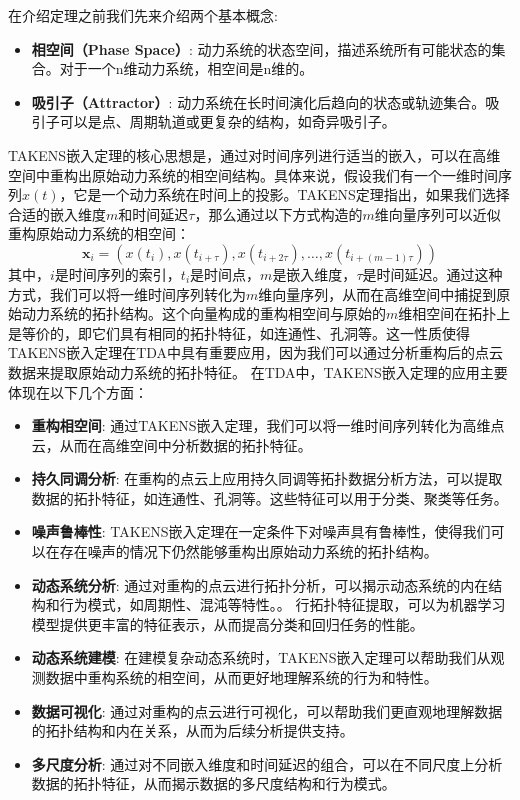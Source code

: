 在介绍定理之前我们先来介绍两个基本概念:
\begin{itemize}
    \item \textbf{相空间（Phase Space）}: 动力系统的状态空间，描述系统所有可能状态的集合。对于一个n维动力系统，相空间是n维的。
    \item \textbf{吸引子（Attractor）}: 动力系统在长时间演化后趋向的状态或轨迹集合。吸引子可以是点、周期轨道或更复杂的结构，如奇异吸引子。
\end{itemize}
TAKENS嵌入定理的核心思想是，通过对时间序列进行适当的嵌入，可以在高维空间中重构出原始动力系统的相空间结构。具体来说，假设我们有一个一维时间序列$x(t)$，它是一个动力系统在时间上的投影。TAKENS定理指出，如果我们选择合适的嵌入维度$m$和时间延迟$\tau$，那么通过以下方式构造的$m$维向量序列可以近似重构原始动力系统的相空间：
\begin{equation}
    \mathbf{x}_i = (x(t_i), x(t_{i+\tau}), x(t_{i+2\tau}), \ldots, x(t_{i+(m-1)\tau}))
\end{equation}
其中，$i$是时间序列的索引，$t_i$是时间点，$m$是嵌入维度，$\tau$是时间延迟。通过这种方式，我们可以将一维时间序列转化为$m$维向量序列，从而在高维空间中捕捉到原始动力系统的拓扑结构。这个向量构成的重构相空间与原始的$m$维相空间在拓扑上是等价的，即它们具有相同的拓扑特征，如连通性、孔洞等。这一性质使得TAKENS嵌入定理在TDA中具有重要应用，因为我们可以通过分析重构后的点云数据来提取原始动力系统的拓扑特征。
在TDA中，TAKENS嵌入定理的应用主要体现在以下几个方面：
\begin{itemize}
    \item \textbf{重构相空间}: 通过TAKENS嵌入定理，我们可以将一维时间序列转化为高维点云，从而在高维空间中分析数据的拓扑特征。
    \item \textbf{持久同调分析}: 在重构的点云上应用持久同调等拓扑数据分析方法，可以提取数据的拓扑特征，如连通性、孔洞等。这些特征可以用于分类、聚类等任务。
    \item \textbf{噪声鲁棒性}: TAKENS嵌入定理在一定条件下对噪声具有鲁棒性，使得我们可以在存在噪声的情况下仍然能够重构出原始动力系统的拓扑结构。
    \item \textbf{动态系统分析}: 通过对重构的点云进行拓扑分析，可以揭示动态系统的内在结构和行为模式，如周期性、混沌等特性。。
行拓扑特征提取，可以为机器学习模型提供更丰富的特征表示，从而提高分类和回归任务的性能。
    \item \textbf{动态系统建模}: 在建模复杂动态系统时，TAKENS嵌入定理可以帮助我们从观测数据中重构系统的相空间，从而更好地理解系统的行为和特性。
    \item \textbf{数据可视化}: 通过对重构的点云进行可视化，可以帮助我们更直观地理解数据的拓扑结构和内在关系，从而为后续分析提供支持。
    \item \textbf{多尺度分析}: 通过对不同嵌入维度和时间延迟的组合，可以在不同尺度上分析数据的拓扑特征，从而揭示数据的多尺度结构和行为模式。
\end{itemize}


